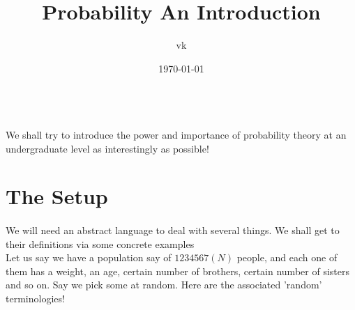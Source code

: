 \documentclass{myclass}
\title{Probability An Introduction}
\author{vk}
\date{\today}
\begin{document}
\maketitle

\begin{center}
    \\
    We shall try to introduce the power and importance of probability theory at an undergraduate level as interestingly as possible!
\end{center}

\section{The Setup}
\paragraph*{}
We will need an abstract language to deal with several things. We shall get to their definitions via some concrete examples\\
Let us say we have a population say of $1234567(N)$ people, and each one of them has a weight, an age, certain number of brothers, certain number of sisters
and so on. Say we pick some at random. Here are the associated 'random' terminologies!
\end{document}

